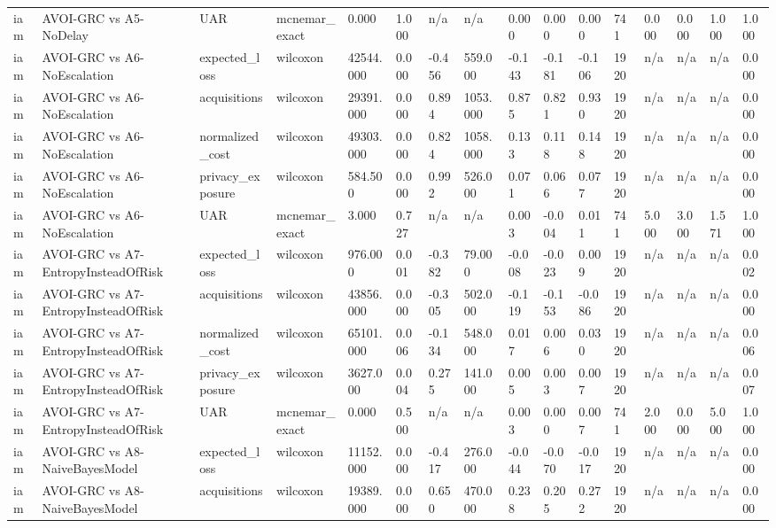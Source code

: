 \begin{table}[!ht]
{\begin{tabular}{llllllllllllllll}
iam & AVOI-GRC vs A5-NoDelay & UAR & mcnemar\_exact & 0.000 & 1.000 & n/a & n/a & 0.000 & 0.000 & 0.000 & 741 & 0.000 & 0.000 & 1.000 & 1.000 \\
iam & AVOI-GRC vs A6-NoEscalation & expected\_loss & wilcoxon & 42544.000 & 0.000 & -0.456 & 559.000 & -0.143 & -0.181 & -0.106 & 1920 & n/a & n/a & n/a & 0.000 \\
iam & AVOI-GRC vs A6-NoEscalation & acquisitions & wilcoxon & 29391.000 & 0.000 & 0.894 & 1053.000 & 0.875 & 0.821 & 0.930 & 1920 & n/a & n/a & n/a & 0.000 \\
iam & AVOI-GRC vs A6-NoEscalation & normalized\_cost & wilcoxon & 49303.000 & 0.000 & 0.824 & 1058.000 & 0.133 & 0.118 & 0.148 & 1920 & n/a & n/a & n/a & 0.000 \\
iam & AVOI-GRC vs A6-NoEscalation & privacy\_exposure & wilcoxon & 584.500 & 0.000 & 0.992 & 526.000 & 0.071 & 0.066 & 0.077 & 1920 & n/a & n/a & n/a & 0.000 \\
iam & AVOI-GRC vs A6-NoEscalation & UAR & mcnemar\_exact & 3.000 & 0.727 & n/a & n/a & 0.003 & -0.004 & 0.011 & 741 & 5.000 & 3.000 & 1.571 & 1.000 \\
iam & AVOI-GRC vs A7-EntropyInsteadOfRisk & expected\_loss & wilcoxon & 976.000 & 0.001 & -0.382 & 79.000 & -0.008 & -0.023 & 0.009 & 1920 & n/a & n/a & n/a & 0.002 \\
iam & AVOI-GRC vs A7-EntropyInsteadOfRisk & acquisitions & wilcoxon & 43856.000 & 0.000 & -0.305 & 502.000 & -0.119 & -0.153 & -0.086 & 1920 & n/a & n/a & n/a & 0.000 \\
iam & AVOI-GRC vs A7-EntropyInsteadOfRisk & normalized\_cost & wilcoxon & 65101.000 & 0.006 & -0.134 & 548.000 & 0.017 & 0.006 & 0.030 & 1920 & n/a & n/a & n/a & 0.006 \\
iam & AVOI-GRC vs A7-EntropyInsteadOfRisk & privacy\_exposure & wilcoxon & 3627.000 & 0.004 & 0.275 & 141.000 & 0.005 & 0.003 & 0.007 & 1920 & n/a & n/a & n/a & 0.007 \\
iam & AVOI-GRC vs A7-EntropyInsteadOfRisk & UAR & mcnemar\_exact & 0.000 & 0.500 & n/a & n/a & 0.003 & 0.000 & 0.007 & 741 & 2.000 & 0.000 & 5.000 & 1.000 \\
iam & AVOI-GRC vs A8-NaiveBayesModel & expected\_loss & wilcoxon & 11152.000 & 0.000 & -0.417 & 276.000 & -0.044 & -0.070 & -0.017 & 1920 & n/a & n/a & n/a & 0.000 \\
iam & AVOI-GRC vs A8-NaiveBayesModel & acquisitions & wilcoxon & 19389.000 & 0.000 & 0.650 & 470.000 & 0.238 & 0.205 & 0.272 & 1920 & n/a & n/a & n/a & 0.000 \\

\end{tabular}}
\end{table}
